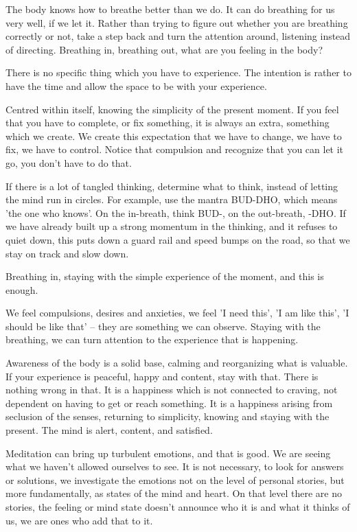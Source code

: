 The body knows how to breathe better than we do. It can do breathing for
us very well, if we let it. Rather than trying to figure out whether you
are breathing correctly or not, take a step back and turn the attention
around, listening instead of directing. Breathing in, breathing out,
what are you feeling in the body?

There is no specific thing which you have to experience. The intention
is rather to have the time and allow the space to be with your
experience.

Centred within itself, knowing the simplicity of the present moment. If
you feel that you have to complete, or fix something, it is always an
extra, something which we create. We create this expectation that we
have to change, we have to fix, we have to control. Notice that
compulsion and recognize that you can let it go, you don't have to do
that.

If there is a lot of tangled thinking, determine what to think, instead
of letting the mind run in circles. For example, use the mantra BUD-DHO,
which means 'the one who knows'. On the in-breath, think BUD-, on the
out-breath, -DHO. If we have already built up a strong momentum in the
thinking, and it refuses to quiet down, this puts down a guard rail and
speed bumps on the road, so that we stay on track and slow down.

Breathing in, staying with the simple experience of the moment, and this
is enough.

We feel compulsions, desires and anxieties, we feel 'I need this', 'I am
like this', 'I should be like that' -- they are something we can
observe. Staying with the breathing, we can turn attention to the
experience that is happening.

Awareness of the body is a solid base, calming and reorganizing what is
valuable. If your experience is peaceful, happy and content, stay with
that. There is nothing wrong in that. It is a happiness which is not
connected to craving, not dependent on having to get or reach something.
It is a happiness arising from seclusion of the senses, returning to
simplicity, knowing and staying with the present. The mind is alert,
content, and satisfied.

Meditation can bring up turbulent emotions, and that is good. We are
seeing what we haven't allowed ourselves to see. It is not necessary, to
look for answers or solutions, we investigate the emotions not on the
level of personal stories, but more fundamentally, as states of the mind
and heart. On that level there are no stories, the feeling or mind state
doesn't announce who it is and what it thinks of us, we are ones who add
that to it.

